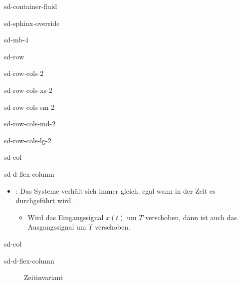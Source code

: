 \documentclass[letterpaper,10pt,english]{jupyterBook}
\let\sphinxpxdimen\pdfpxdimen\else\newdimen\sphinxpxdimen
\begin{document}
\begin{sphinxuseclass}{sd-container-fluid}
\begin{sphinxuseclass}{sd-sphinx-override}
\begin{sphinxuseclass}{sd-mb-4}
\begin{sphinxuseclass}{sd-row}
\begin{sphinxuseclass}{sd-row-cols-2}
\begin{sphinxuseclass}{sd-row-cols-xs-2}
\begin{sphinxuseclass}{sd-row-cols-sm-2}
\begin{sphinxuseclass}{sd-row-cols-md-2}
\begin{sphinxuseclass}{sd-row-cols-lg-2}
\begin{sphinxuseclass}{sd-col}
\begin{sphinxuseclass}{sd-d-flex-column}\begin{itemize}
\item {} 
\sphinxAtStartPar
{}: Das Systeme verhält sich immer gleich, egal wann in der Zeit es durchgeführt wird.
\begin{itemize}
\item {} 
\sphinxAtStartPar
Wird das Eingangssignal \(x(t)\) um \(T\) verschoben, dann ist auch das Ausgangssignal um \(T\) verschoben.

\end{itemize}

\end{itemize}

\end{sphinxuseclass}
\end{sphinxuseclass}
\begin{sphinxuseclass}{sd-col}
\begin{sphinxuseclass}{sd-d-flex-column}
\begin{figure}[htbp]
\centering
\capstart

\noindent\sphinxincludegraphics[width=400\sphinxpxdimen]{{LTI_zeit}.jpg}
\caption{Zeitinvariant}\label{\detokenize{content/5_LTI:lti-zeit}}\end{figure}

\end{sphinxuseclass}
\end{sphinxuseclass}
\end{sphinxuseclass}
\end{sphinxuseclass}
\end{sphinxuseclass}
\end{sphinxuseclass}
\end{sphinxuseclass}
\end{sphinxuseclass}
\end{sphinxuseclass}
\end{sphinxuseclass}
\end{sphinxuseclass}
\end{document}

